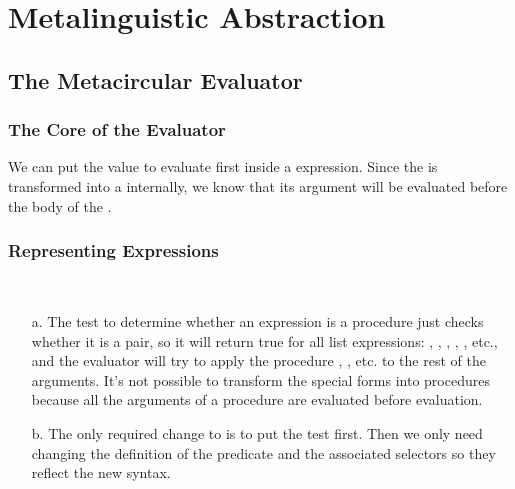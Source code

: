 \chapter{Metalinguistic Abstraction}

\section{The Metacircular Evaluator}

\subsection{The Core of the Evaluator}

\begin{exe}[4.1]
    We can put the value to evaluate first inside a  expression. Since 
    the  is transformed into a  internally, we know that 
    its argument will be evaluated before the body of the .
\end{exe}

\subsection{Representing Expressions}

\begin{exe}[4.2]
    \ \vspace{-20pt}
    \begin{itemize}
	\item[a.] The test to determine whether an expression is a procedure 
	    just checks whether it is a pair, so it will return true for all 
	    list expressions: , , , 
	    , , etc., and the evaluator will try to 
	    apply the procedure , , etc. to the rest of the 
	    arguments. It’s not possible to transform the special forms into 
	    procedures because all the arguments of a procedure are evaluated 
	    before evaluation.
	\item[b.] The only required change to  is to put the 
	     test first. Then we only need changing the 
	    definition of the  predicate and the associated 
	    selectors so they reflect the new syntax.
    \end{itemize}
\end{exe}

